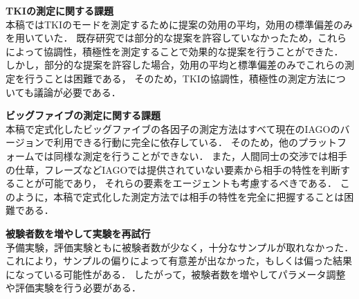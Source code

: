 \begin{description}
    \item{\textbf{TKIの測定に関する課題}}\mbox{}\\
    本稿ではTKIのモードを測定するために提案の効用の平均，効用の標準偏差のみを用いていた．
    既存研究では部分的な提案を許容していなかったため，これらによって協調性，積極性を測定することで効果的な提案を行うことができた．
    しかし，部分的な提案を許容した場合，効用の平均と標準偏差のみでこれらの測定を行うことは困難である，
    そのため，TKIの協調性，積極性の測定方法についても議論が必要である．
    \item{\textbf{ビッグファイブの測定に関する課題}}\mbox{}\\
    本稿で定式化したビッグファイブの各因子の測定方法はすべて現在のIAGOのバージョンで利用できる行動に完全に依存している．
    そのため，他のプラットフォームでは同様な測定を行うことができない．
    また，人間同士の交渉では相手の仕草，フレーズなどIAGOでは提供されていない要素から相手の特性を判断することが可能であり，
    それらの要素をエージェントも考慮するべきである．
    このように，本稿で定式化した測定方法では相手の特性を完全に把握することは困難である．
    \item{\textbf{被験者数を増やして実験を再試行}}\mbox{}\\
    予備実験，評価実験ともに被験者数が少なく，十分なサンプルが取れなかった．
    これにより，サンプルの偏りによって有意差が出なかった，もしくは偏った結果になっている可能性がある．
    したがって，被験者数を増やしてパラメータ調整や評価実験を行う必要がある．
\end{description}

